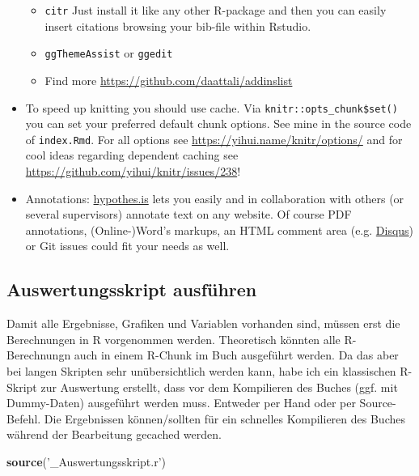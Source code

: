 \documentclass[]{book}
\makeatletter
\newenvironment{Shaded}{\begin{snugshade}}{\end{snugshade}}
\newcommand{\KeywordTok}[1]{\textcolor[rgb]{0.13,0.29,0.53}{\textbf{{#1}}}}
\newcommand{\StringTok}[1]{\textcolor[rgb]{0.31,0.60,0.02}{{#1}}}
\newcommand{\NormalTok}[1]{{#1}}
\providecommand{\tightlist}{%
  \setlength{\itemsep}{0pt}\setlength{\parskip}{0pt}}
\newenvironment{kframe}{%
\medskip{}
\setlength{\fboxsep}{.8em}
 \def\at@end@of@kframe{}%
 \ifinner\ifhmode%
  \def\at@end@of@kframe{\end{minipage}}%
  \begin{minipage}{\columnwidth}%
 \fi\fi%
 \def\FrameCommand##1{\hskip\@totalleftmargin \hskip-\fboxsep
 \colorbox{shadecolor}{##1}\hskip-\fboxsep
     \hskip-\linewidth \hskip-\@totalleftmargin \hskip\columnwidth}%
 \MakeFramed {\advance\hsize-\width
   \@totalleftmargin\z@ \linewidth\hsize
   \@setminipage}}%
 {\par\unskip\endMakeFramed%
 \at@end@of@kframe}
\renewenvironment{Shaded}{\begin{kframe}}{\end{kframe}}
\theoremstyle{definition}
\theoremstyle{definition}
\theoremstyle{remark}
\makeatother
\begin{document}
\begin{itemize}
  \begin{itemize}
  \tightlist
  \item
    \texttt{citr} Just install it like any other R-package and then you
    can easily insert citations browsing your bib-file within Rstudio.
  \item
    \texttt{ggThemeAssist} or \texttt{ggedit}
  \item
    Find more \url{https://github.com/daattali/addinslist}
  \end{itemize}
\item
  To speed up knitting you should use cache. Via
  \texttt{knitr::opts\_chunk\$set()} you can set your preferred default
  chunk options. See mine in the source code of \texttt{index.Rmd}. For
  all options see \url{https://yihui.name/knitr/options/} and for cool
  ideas regarding dependent caching see
  \url{https://github.com/yihui/knitr/issues/238}!
\item
  Annotations: \href{https://web.hypothes.is/}{hypothes.is} lets you
  easily and in collaboration with others (or several supervisors)
  annotate text on any website. Of course PDF annotations,
  (Online-)Word's markups, an HTML comment area (e.g.
  \href{https://disqus.com/}{Disqus}) or Git issues could fit your needs
  as well.
\end{itemize}

\subsection*{Auswertungsskript
ausführen}\label{auswertungsskript-ausfuhren}

Damit alle Ergebnisse, Grafiken und Variablen vorhanden sind, müssen
erst die Berechnungen in R vorgenommen werden. Theoretisch könnten alle
R-Berechnungn auch in einem R-Chunk im Buch ausgeführt werden. Da das
aber bei langen Skripten sehr unübersichtlich werden kann, habe ich ein
klassischen R-Skript zur Auswertung erstellt, dass vor dem Kompilieren
des Buches (ggf. mit Dummy-Daten) ausgeführt werden muss. Entweder per
Hand oder per Source-Befehl. Die Ergebnissen können/sollten für ein
schnelles Kompilieren des Buches während der Bearbeitung gecached
werden.

\begin{Shaded}
\begin{Highlighting}[]
\KeywordTok{source}\NormalTok{(}\StringTok{'_Auswertungsskript.r'}\NormalTok{)}
\end{Highlighting}
\end{Shaded}
\end{document}
